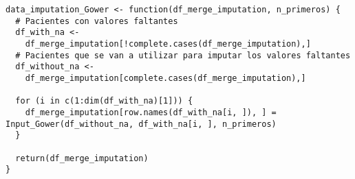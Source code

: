 \begin{lstlisting}[style=mystyle,caption={data\_imputation\_Gower.R}, label={lst:input-gower-fun-preprocesamiento}]
  data_imputation_Gower <- function(df_merge_imputation, n_primeros) {
  # Pacientes con valores faltantes
  df_with_na <-
    df_merge_imputation[!complete.cases(df_merge_imputation),]
  # Pacientes que se van a utilizar para imputar los valores faltantes
  df_without_na <-
    df_merge_imputation[complete.cases(df_merge_imputation),]
  
  for (i in c(1:dim(df_with_na)[1])) {
    df_merge_imputation[row.names(df_with_na[i, ]), ] = Input_Gower(df_without_na, df_with_na[i, ], n_primeros)
  }
  
  return(df_merge_imputation)
}
\end{lstlisting}

\vspace{-5pt}
